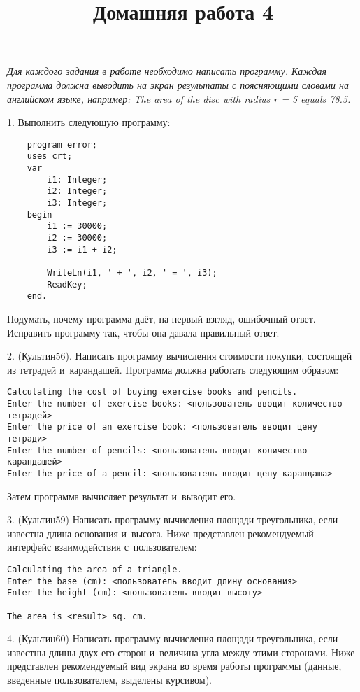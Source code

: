 \documentclass[12pt,russian,draft]{article}
\title{Домашняя работа 4}
\date{}
\begin{document}
\maketitle{}

\emph{Для каждого задания в работе необходимо написать программу. Каждая
    программа должна выводить на экран результаты с поясняющими словами на
    английском языке, например: The area of the disc with radius r = 5 equals
    78.5.}

1. Выполнить следующую программу:
\begin{lstlisting}
    program error;
    uses crt;
    var
        i1: Integer;
        i2: Integer;
        i3: Integer;
    begin
        i1 := 30000;
        i2 := 30000;
        i3 := i1 + i2;

        WriteLn(i1, ' + ', i2, ' = ', i3);
        ReadKey;
    end.
\end{lstlisting}

Подумать, почему программа даёт, на первый взгляд, ошибочный ответ. Исправить
программу так, чтобы она давала правильный ответ.

2. (Культин56). Написать программу вычисления стоимости покупки, состоящей из
тет\-ра\-дей и~ка\-рандашей. Программа должна работать следующим образом:

\begin{verbatim}
Calculating the cost of buying exercise books and pencils.
Enter the number of exercise books: <пользователь вводит количество тетрадей>
Enter the price of an exercise book: <пользователь вводит цену тетради>
Enter the number of pencils: <пользователь вводит количество карандашей>
Enter the price of a pencil: <пользователь вводит цену карандаша>
\end{verbatim}

Затем программа вычисляет результат и~выводит его.

3. (Культин59) Написать программу вычисления площади треугольника, если
известна длина основания и~высота. Ниже представлен рекомендуемый интерфейс
взаимодействия с~пользователем:

\begin{verbatim}
Calculating the area of a triangle.
Enter the base (cm): <пользователь вводит длину основания>
Enter the height (cm): <пользователь вводит высоту>

The area is <result> sq. cm.
\end{verbatim}

4. (Культин60) Написать программу вычисления площади треугольника, если
известны длины двух его сторон и~величина угла между этими сторонами. Ниже
представлен реко\-мен\-ду\-емый вид экрана во время работы программы (данные,
введенные пользователем, выделены курсивом).
\end{document}

